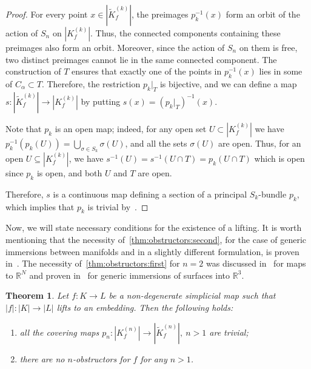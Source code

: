 \documentclass[a4paper,12pt,reqno,oneside]{amsart}
\theoremstyle{plain}
\newtheorem{theorem}{Theorem}
\theoremstyle{definition}
\theoremstyle{plain}
\newcommand{\from}{\colon}
\newcommand{\wt}[1]{\widetilde{#1}}
\newcommand{\R}{\mathbb{R}}
\begin{document}
\begin{proof}
  For every point $x \in |\wt{K}^{(k)}_f|$, the preimages $p_k^{-1}(x)$ form an orbit of the action of
  $S_{n}$ on $|K^{(k)}_f|$. Thus, the connected components containing these preimages also form an
  orbit. Moreover, since the action of $S_{n}$ on them is free, two distinct preimages cannot lie in the
  same connected component. The construction of $T$ ensures that exactly one of the points in
  $p_k^{-1}(x)$ lies in some of $C_\alpha \subset T$. Therefore, the restriction $p_k \big|_T$ is bijective,
  and we can define a map $s \from |\wt{K}^{(k)}_f| \to |K^{(k)}_f|$ by putting
  $s(x) = \left(p_k \big|_T\right)^{-1}(x)$.

  Note that $p_k$ is an open map; indeed, for any open set $U \subset |K^{(k)}_f|$ we have
  $p_k^{-1}(p_k(U)) = \bigcup_{\sigma \in S_k} \sigma(U)$, and all the sets $\sigma(U)$ are
  open. Thus, for an open $U \subseteq |K^{(k)}_f|$, we have $s^{-1}(U) = s^{-1}(U \cap T) = p_k(U \cap
  T)$ which is open since $p_k$ is open, and both $U$ and $T$ are open.

  Therefore, $s$ is a continuous map defining a section of a principal $S_k$-bundle $p_k$, which
  implies that $p_k$ is trivial by~\cite[Proposition 2.1]{principal_bundles}.
\end{proof}

Now, we will state necessary conditions for the existence of a lifting. It is worth mentioning that
the necessity of~\cref{thm:obstructors:second}, for the case of generic immersions between manifolds
and in a slightly different formulation, is proven in~\cite[Lemme 1.1]{poen_fr}. The necessity
of~\cref{thm:obstructors:first} for $n=2$ was discussed in~\cite[\S 3.1]{akh_rep_skop} for maps to
$\R^N$ and proven in~\cite[Corollary 3]{giller} for generic immersions of surfaces into $\R^3$.

\begin{theorem}\label{thm:obstructors}
  Let $f \from K \to L$ be a non-degenerate simplicial map such that $|f| \from |K| \to |L|$ lifts
  to an embedding. Then the following holds:
  \begin{enumerate}
  \item\label{thm:obstructors:first} all the covering maps $p_n \from |K^{(n)}_f| \to |\wt{K}^{(n)}_f|,\ n > 1$ are trivial;
  \item\label{thm:obstructors:second} there are no $n$-obstructors for $f$ for any $n > 1$.
  \end{enumerate}
\end{theorem}
\end{document}
